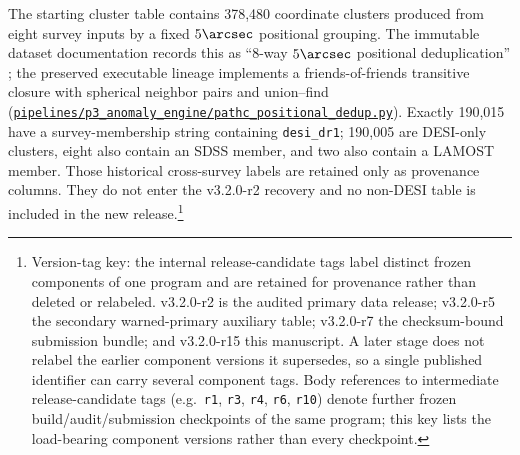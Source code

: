 \documentclass[twocolumn,linenumbers]{aastex702}
\newcommand{\repoBase}{https://github.com/Hubify-Projects/bigbounce/blob/main}
\newcommand{\artifact}[1]{\href{\repoBase/#1}{\nolinkurl{#1}}}
\newcommand{\paperVersion}{v3.2.0-r15}
\newcommand{\releaseVersion}{v3.2.0-r2}
\newcommand{\warnedAuxVersion}{v3.2.0-r5}
\newcommand{\bundleVersion}{v3.2.0-r7}
\begin{document}
The starting cluster table contains 378,480 coordinate clusters produced from eight survey
inputs by a fixed $5\arcsec$ positional grouping.  The immutable dataset documentation records
this as ``8-way $5\arcsec$ positional deduplication'' \citep{Golden2026Data}; the preserved
executable lineage implements a friends-of-friends transitive closure with spherical neighbor
pairs and union--find
(\artifact{pipelines/p3\_anomaly\_engine/pathc\_positional\_dedup.py}).  Exactly 190,015 have a
survey-membership string containing \texttt{desi\_dr1};
190,005 are DESI-only clusters, eight also contain an SDSS member, and two also contain a LAMOST
member.  Those historical cross-survey labels are retained only as provenance columns.  They do
not enter the \releaseVersion{} recovery and no non-DESI table is included in the new
release.\footnote{Version-tag key: the internal release-candidate tags label distinct frozen
components of one program and are retained for provenance rather than deleted or relabeled.
\releaseVersion{} is the audited primary data release; \warnedAuxVersion{} the secondary
warned-primary auxiliary table; \bundleVersion{} the checksum-bound submission bundle; and
\paperVersion{} this manuscript.  A later stage does not relabel the earlier component versions it
supersedes, so a single published identifier can carry several component tags.  Body references to
intermediate release-candidate tags (e.g.\ \texttt{r1}, \texttt{r3}, \texttt{r4}, \texttt{r6},
\texttt{r10}) denote further frozen build/audit/submission checkpoints of the same program; this
key lists the load-bearing component versions rather than every checkpoint.}
\end{document}
